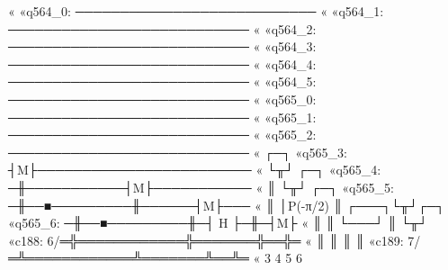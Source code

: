 «                                   
«q564_0: ───────────────────────────
«                                   
«q564_1: ───────────────────────────
«                                   
«q564_2: ───────────────────────────
«                                   
«q564_3: ───────────────────────────
«                                   
«q564_4: ───────────────────────────
«                                   
«q564_5: ───────────────────────────
«                                   
«q565_0: ───────────────────────────
«                                   
«q565_1: ───────────────────────────
«                                   
«q565_2: ───────────────────────────
«        ┌─┐                        
«q565_3: ┤M├────────────────────────
«        └╥┘          ┌─┐           
«q565_4: ─╫───────────┤M├───────────
«         ║           └╥┘     ┌─┐   
«q565_5: ─╫──■─────────╫──────┤M├───
«         ║  │P(-π/2)  ║ ┌───┐└╥┘┌─┐
«q565_6: ─╫──■─────────╫─┤ H ├─╫─┤M├
«         ║            ║ └───┘ ║ └╥┘
«c188: 6/═╬════════════╬═══════╬══╬═
«         ║            ║       ║  ║ 
«c189: 7/═╩════════════╩═══════╩══╩═
«         3            4       5  6 
